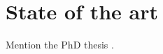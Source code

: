 \chapter{State of the art} \label{chap:state-of-the-art}
Mention the PhD thesis \cite{ribas10}.





